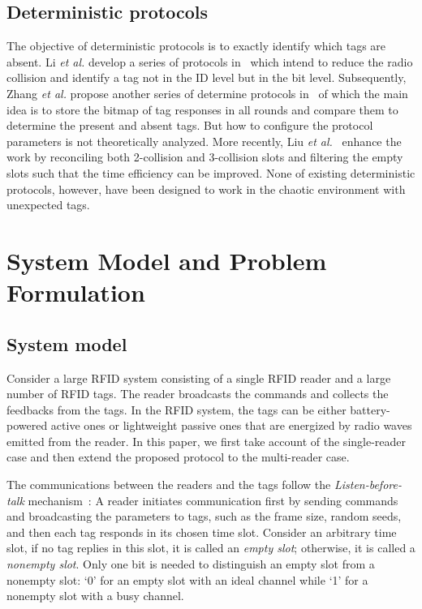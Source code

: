 \documentclass[10pt, twocolumn]{IEEEtran}
\begin{document}
\subsection{Deterministic protocols}
The objective of deterministic protocols is to exactly identify which tags are absent. Li \textit{et al.} develop a series of protocols in~\cite{li2010identifying} which intend to reduce the radio collision and identify a tag not in the ID level but in the bit level. Subsequently, Zhang \textit{et al.} propose another series of determine protocols in~\cite{zhang2011fast} of which the main idea is to store the bitmap of tag responses in all rounds and compare them to determine the present and absent tags. But how to configure the protocol parameters is not theoretically analyzed. More recently, Liu \textit{et al.}~\cite{liu2015completely} enhance the work by reconciling both 2-collision and 3-collision slots and filtering the empty slots such that the time efficiency can be improved. None of existing deterministic protocols, however, have been designed to work in the chaotic environment with unexpected tags.

\section{System Model and Problem Formulation}
\label{sec:model and formulation}

\subsection{System model}

Consider a large RFID system consisting of a single RFID reader and a large number of RFID tags.
The reader broadcasts the commands and collects the feedbacks from the tags. In the RFID system, the tags can be either battery-powered active ones or lightweight passive ones that are energized by radio waves emitted from the reader. In this paper, we first take account of the single-reader case and then extend the proposed protocol to the multi-reader case.

The communications between the readers and the tags follow the \textit{Listen-before-talk} mechanism~\cite{han2010counting}: A reader initiates communication first by sending commands and broadcasting the parameters to tags, such as the frame size, random seeds, and then each tag responds in its chosen time slot. Consider an arbitrary time slot, if no tag replies in this slot, it is called an \textit{empty slot}; otherwise, it is called a \textit{nonempty slot}. Only one bit is needed to distinguish an empty slot from a nonempty slot: `0' for an empty slot with an ideal channel while `1' for a nonempty slot with a busy channel.
\end{document}
